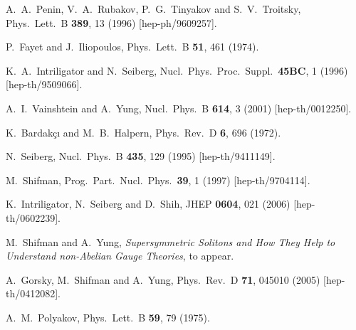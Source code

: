 \documentclass[epsfig,12pt]{article}
\begin{document}
\begin{thebibliography}{99}
 


 A.~A.~Penin, V.~A.~Rubakov, P.~G.~Tinyakov and S.~V.~Troitsky,
  Phys.\ Lett.\ B {\bf 389}, 13 (1996)
  [hep-ph/9609257].
  
P.~Fayet and J.~Iliopoulos,
Phys.\ Lett.\ B {\bf 51}, 461 (1974).

K.~A.~Intriligator and N.~Seiberg,
  Nucl.\ Phys.\ Proc.\ Suppl.\  {\bf 45BC}, 1 (1996)
  [hep-th/9509066].
  
A.~I.~Vainshtein and A.~Yung,
Nucl.\ Phys.\ B {\bf 614}, 3 (2001)
[hep-th/0012250].

K.~Bardak\c{c}{\i}    and M.~B.~Halpern,
Phys.\ Rev.\ D {\bf 6}, 696 (1972).

N.~Seiberg,
  Nucl.\ Phys.\ B {\bf 435}, 129 (1995)
  [hep-th/9411149].
    
M.~Shifman,
  Prog.\ Part.\ Nucl.\ Phys.\  {\bf 39}, 1 (1997)
  [hep-th/9704114].
  
K.~Intriligator, N.~Seiberg and D.~Shih,
  JHEP {\bf 0604}, 021 (2006)
  [hep-th/0602239].
  


M.~Shifman and A.~Yung,
{\em Supersymmetric Solitons and
How They Help  
to Understand non-Abelian Gauge Theories},
to appear.

A.~Gorsky, M.~Shifman and A.~Yung,
  Phys.\ Rev.\ D {\bf 71}, 045010 (2005)
  [hep-th/0412082].
  
A.~M.~Polyakov,
Phys.\ Lett.\ B {\bf 59}, 79 (1975).


\end{thebibliography}
\end{document}
